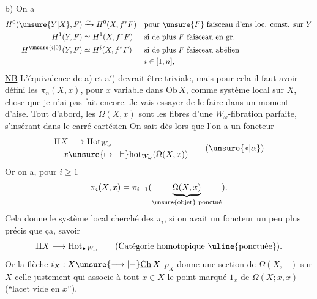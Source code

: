 b) On a
\[
\begin{aligned}
 H^0(\unsure{Y|X},F)&\xrightarrow{\sim} H^0(X,f^*F) &&\text{pour $\unsure{F}$ faisceau d'ens loc. const. sur $Y$}\\
 H^1(Y,F)&\simeq H^1(X,f^*F) &&\text{si de plus $F$ faisceau en gr.}\\
 H^{\unsure{i|0}}(Y,F)&\simeq H^i(X,f^*F) &&\text{si de plus $F$ faisceau abélien}\\
 &&&i\in[1,n],
\end{aligned}
\]
\uline{NB} L'équivalence de a) et a$'$) devrait être triviale, mais pour cela il faut avoir défini les $\pi_n(X,x)$, pour $x$ variable dans $\mathrm{Ob}\,X$, comme système local sur $X$, chose que je n'ai pas fait encore. Je vais essayer de le faire dans un moment d'aise. 
Tout d'abord, les $\Omega(X,x)$ sont les fibres d'une $W_\omega$-fibration parfaite, s'insérant dans le carré cartésien
On sait dès lors que l'on a un foncteur
\[
\begin{aligned}
\Pi X&\longrightarrow\mathrm{Hot}_{W_\omega}\\
x&\unsure{\mapsto|\vdash}\mathrm{hot}_{W_\omega}(\Omega(X,x))
\end{aligned}
\tag*{($\unsure{*|\alpha}$)}
\]
Or on a, pour $i\geq1$
\[
\pi_i(X,x)=\pi_{i-1}(\underbrace{\Omega(X,x)}_{\text{\unsure{objet} ponctué}}).
\]
Cela donne le système local cherché des $\pi_i$, si  on avait un foncteur un peu plus précis que ça, savoir
\[
\Pi X\longrightarrow\mathrm{Hot}_{\bullet\,W_\omega}
\qquad\text{(Catégorie homotopique \uline{ponctuée}).}
\]
Or la  flèche $i_X:X\unsure{\longrightarrow|-}\underline{\mathrm{Ch}}\,X$  $p_X$ donne une section  de $\Omega(X,-)$ sur $X$ \textendash
celle justement qui associe à tout $x\in X$ le point marqué $1_x$ de $\Omega(X;x,x)$ (``lacet vide en $x$'').


